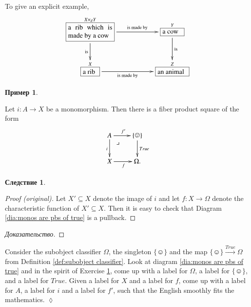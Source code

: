 \documentclass[a4paper]{book}
\makeatletter
\def\tn{\textnormal}
\def\singleton{\{\smiley\}}
\def\to{\rightarrow}
\def\taking{\colon}
\def\ss{\subseteq}
\newcommand{\LA}[2]{\ar[#1]^-{\tn {#2}}}
\newcommand{\LAL}[2]{\ar[#1]_-{\tn {#2}}}
\newcommand{\obox}[3]{\stackrel{#1}{\fbox{\parbox{#2}{#3}}}}
\def\ullimit{\ar@{}[rd]|(.3)*+{\lrcorner}}
\newcommand{\To}[1]{\xrightarrow{#1}}
\theoremstyle{myth}
\newtheorem{corollaryENG}[envENG]{\begin{english}Corollary\end{english}}
\newtheorem{exampleENG}[envENG]{\begin{english}Example\end{english}}
\newtheorem{excENG}[envENG]{\begin{english}Exercise\end{english}}
\newenvironment{proofENG}{\begin{proof}[Proof (original)]}{\end{proof}}
\newenvironment{exerciseENG}{\begin{excENG}}{\hspace*{\fill}$\lozenge$\end{excENG}}
\newtheorem{corollaryRUS}[envRUS]{Следствие}
\newtheorem{exampleRUS}[envRUS]{Пример}
\newenvironment{proofRUS}{\begin{proof}[Доказательство]}{\end{proof}}
\makeatother
\begin{document}
\begin{russian}
\begin{exampleENG}
To give an explicit example, 
$$\xymatrix{
\obox{X\times_ZY}{.9in}{a rib which is made by a cow}\LA{rr}{is made by}\LAL{d}{is}&&\obox{Y}{.4in}{a cow}\LA{d}{is}\\
\obox{X}{.3in}{a rib}\LAL{rr}{is made by}&&\obox{Z}{.6in}{an animal}
}
$$
\end{exampleENG}

\begin{exampleRUS}\label{exc:olog pullbacks}
 
\end{exampleRUS}

\begin{corollaryENG}\label{cor:monos are pullbacks of true}
Let $i\taking A\to X$ be a monomorphism. Then there is a fiber product square of the form 
\begin{align}\label{dia:monos are pbs of true}
\xymatrix{A\ar[r]^{f'}\ar[d]_i\ullimit&\singleton\ar[d]^{True}\\X\ar[r]_f&\Omega.}
\end{align}
\end{corollaryENG}

\begin{corollaryRUS}\label{cor:monos are pullbacks of true}
 
\end{corollaryRUS}

\begin{proofENG}
Let $X'\ss X$ denote the image of $i$ and let $f\taking X\to\Omega$ denote the characteristic function of $X'\ss X$. Then it is easy to check that Diagram \ref{dia:monos are pbs of true} is a pullback.
\end{proofENG}

\begin{proofRUS}
 
\end{proofRUS}

\begin{exerciseENG}
Consider the subobject classifier $\Omega$, the singleton $\singleton$ and the map $\singleton\To{True}\Omega$ from Definition \ref{def:subobject classifier}. Look at diagram \ref{dia:monos are pbs of true} and in the spirit of Exercise \ref{exc:olog pullbacks}, come up with a label for $\Omega$, a label for $\singleton$, and a label for $True$. Given a label for $X$ and a label for $f$, come up with a label for $A$, a label for $i$ and a label for $f'$, such that the English smoothly fits the mathematics.
\end{exerciseENG}


\end{russian}
\end{document}
